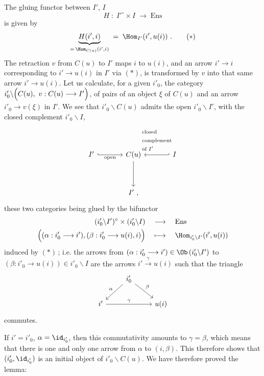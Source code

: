 The gluing functor between $I'$, $I$
\[
H \;:\; I'^\circ\times I \;\longrightarrow\; \mathrm{Ens}
\]
is given by
\[
\underbrace{H(i',i)}_{=\,\Hom_{C(u)}(i',i)} \;=\; \Hom_{I'}(i',u(i))\ . \tag*{$(*)$}
\]
The retraction $v$ from $C(u)$ to $I'$ maps $i$ to $u(i)$, and an arrow $i'\longrightarrow i$ corresponding to $i'\longrightarrow u(i)$ in $I'$ via $(*)$, is transformed by $v$ into that same arrow $i'\longrightarrow u(i)$. Let us calculate, %
for a given $i'_0$, the category $i'_0\backslash\Bigl(C(u),\ v : C(u)\longrightarrow I'\Bigr)$, of pairs of an object $\xi$ of $C(u)$ %
and an arrow $i'_0\longrightarrow v(\xi)$ in $I'$. We see that $i'_0\backslash C(u)$ admits the open $i'_0\backslash I'$, with the closed complement $i'_0\backslash I$,
\[
\begin{tikzcd}[column sep=large, row sep=huge]
I' \arrow[r, hook, "\text{open}"'] & C(u) \arrow[d] & I \arrow[l, hook', "\begin{array}{l}\text{closed}\\ \text{complement}\\ \text{of } I'\end{array}"'] \\
 & I'\ ,
\end{tikzcd}
\]
these two categories being glued by the bifunctor
\[
\begin{aligned}
(i'_0\backslash I')^\circ \times (i'_0\backslash I) &\quad\longrightarrow\quad \mathrm{Ens}\\
\Bigl((\alpha : i'_0\longrightarrow i'), (\beta : i'_0\longrightarrow u(i), i)\Bigr) &\quad\longmapsto\quad \Hom_{i'_0\backslash I'}(i',u(i))
\end{aligned}
\]
induced by $(*)$\,; i.e. the arrows from $(\alpha : i'_0\longrightarrow i') \in \Ob\,(i'_0\backslash I')$ to $(\beta : i'_0\longrightarrow u(i)) \in i'_0\backslash I$ are the arrows $i' \xrightarrow{\gamma} u(i)$ such that the triangle
\[
\begin{tikzcd}
 & i'_0 \arrow[dl, "\alpha"'] \arrow[dr, "\beta"] & \\
i' \arrow[rr, "\gamma"] & & u(i)
\end{tikzcd}
\]
commutes.

If $i' = i'_0$, $\alpha = \id_{i'_0}$, then this commutativity amounts to $\gamma = \beta$, which means that there is one and only one arrow from $\alpha$ to $(i,\beta)$. This therefore shows that $(i'_0,\id_{i'_0})$ is an initial object of $i'_0\backslash C(u)$. We have therefore proved the lemma:

